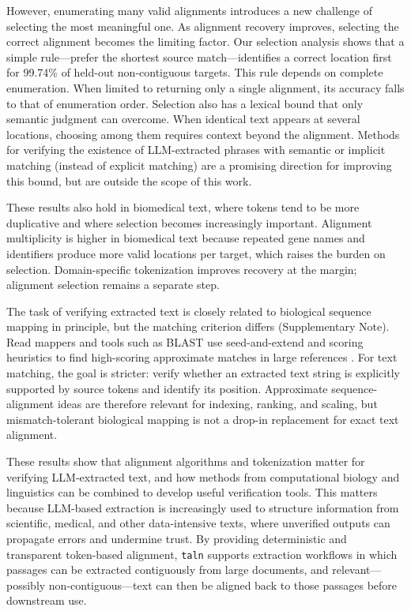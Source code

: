 \documentclass[10pt,twocolumn]{article}
\theoremstyle{plain}
\theoremstyle{definition}
\theoremstyle{remark}
\begin{document}
However, enumerating many valid alignments introduces a new challenge of selecting the most meaningful one. As alignment recovery improves, selecting the correct alignment becomes the limiting factor. Our selection analysis shows that a simple rule---prefer the shortest source match---identifies a correct location first for 99.74\% of held-out non-contiguous targets. This rule depends on complete enumeration. When limited to returning only a single alignment, its accuracy falls to that of enumeration order. Selection also has a lexical bound that only semantic judgment can overcome. When identical text appears at several locations, choosing among them requires context beyond the alignment. Methods for verifying the existence of LLM-extracted phrases with semantic or implicit matching (instead of explicit matching) are a promising direction for improving this bound, but are outside the scope of this work.

These results also hold in biomedical text, where tokens tend to be more duplicative and where selection becomes increasingly important. Alignment multiplicity is higher in biomedical text because repeated gene names and identifiers produce more valid locations per target, which raises the burden on selection. Domain-specific tokenization improves recovery at the margin; alignment selection remains a separate step.

The task of verifying extracted text is closely related to biological sequence mapping in principle, but the matching criterion differs (Supplementary Note). Read mappers and tools such as BLAST use seed-and-extend and scoring heuristics to find high-scoring approximate matches in large references \citep{Altschul_1990}. For text matching, the goal is stricter: verify whether an extracted text string is explicitly supported by source tokens and identify its position. Approximate sequence-alignment ideas are therefore relevant for indexing, ranking, and scaling, but mismatch-tolerant biological mapping is not a drop-in replacement for exact text alignment.

These results show that alignment algorithms and tokenization matter for verifying LLM-extracted text, and how methods from computational biology and linguistics can be combined to develop useful verification tools. This matters because LLM-based extraction is increasingly used to structure information from scientific, medical, and other data-intensive texts, where unverified outputs can propagate errors and undermine trust. By providing deterministic and transparent token-based alignment, \texttt{taln} supports extraction workflows in which passages can be extracted contiguously from large documents, and relevant---possibly non-contiguous---text can then be aligned back to those passages before downstream use.
\end{document}
